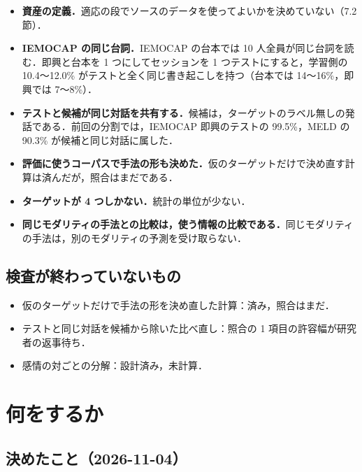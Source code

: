 \documentclass[11pt,a4paper]{ltjsarticle}
\begin{document}
\begin{itemize}
  \item \textbf{資産の定義．}適応の段でソースのデータを使ってよいかを決めていない（7.2 節）．
  \item \textbf{IEMOCAP の同じ台詞．}IEMOCAP の台本では 10 人全員が同じ台詞を読む．即興と台本を 1 つにしてセッションを 1 つテストにすると，学習側の 10.4〜12.0\% がテストと全く同じ書き起こしを持つ（台本では 14〜16\%，即興では 7〜8\%）．
  \item \textbf{テストと候補が同じ対話を共有する．}候補は，ターゲットのラベル無しの発話である．前回の分割では，IEMOCAP 即興のテストの 99.5\%，MELD の 90.3\% が候補と同じ対話に属した．
  \item \textbf{評価に使うコーパスで手法の形も決めた．}仮のターゲットだけで決め直す計算は済んだが，照合はまだである．
  \item \textbf{ターゲットが 4 つしかない．}統計の単位が少ない．
  \item \textbf{同じモダリティの手法との比較は，使う情報の比較である．}同じモダリティの手法は，別のモダリティの予測を受け取らない．
\end{itemize}

\subsection{検査が終わっていないもの}

\begin{itemize}
  \item 仮のターゲットだけで手法の形を決め直した計算：済み，照合はまだ．
  \item テストと同じ対話を候補から除いた比べ直し：照合の 1 項目の許容幅が研究者の返事待ち．
  \item 感情の対ごとの分解：設計済み，未計算．
\end{itemize}

\section{何をするか}

\subsection{決めたこと（2026-11-04）}
\end{document}
